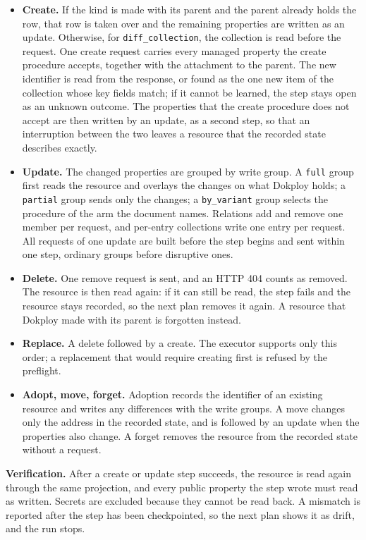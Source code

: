 \begin{itemize}
\item
  \textbf{Create.} If the kind is made with its parent and the parent already holds the row, that row is
  taken over and the remaining properties are written as an update. Otherwise, for \texttt{diff\_collection},
  the collection is read before the request. One create request carries every managed property the
  create procedure accepts, together with the attachment to the parent. The new identifier is read from
  the response, or found as the one new item of the collection whose key fields match; if it cannot
  be learned, the step stays open as an unknown outcome. The properties that the create procedure
  does not accept are then written by an update, as a second step, so that an interruption between
  the two leaves a resource that the recorded state describes exactly.
\item
  \textbf{Update.} The changed properties are grouped by write group. A \texttt{full} group first reads the
  resource and overlays the changes on what Dokploy holds; a \texttt{partial} group sends only the changes;
  a \texttt{by\_variant} group selects the procedure of the arm the document names. Relations add and remove
  one member per request, and per-entry collections write one entry per request. All requests of one
  update are built before the step begins and sent within one step, ordinary groups before disruptive
  ones.
\item
  \textbf{Delete.} One remove request is sent, and an HTTP 404 counts as removed. The resource is then read
  again: if it can still be read, the step fails and the resource stays recorded, so the next plan
  removes it again. A resource that Dokploy made with its parent is forgotten instead.
\item
  \textbf{Replace.} A delete followed by a create. The executor supports only this order; a replacement
  that would require creating first is refused by the preflight.
\item
  \textbf{Adopt, move, forget.} Adoption records the identifier of an existing resource and writes any
  differences with the write groups. A move changes only the address in the recorded state, and is
  followed by an update when the properties also change. A forget removes the resource from the
  recorded state without a request.
\end{itemize}

\textbf{Verification.} After a create or update step succeeds, the resource is read again through the same
projection, and every public property the step wrote must read as written. Secrets are excluded
because they cannot be read back. A mismatch is reported after the step has been checkpointed, so the
next plan shows it as drift, and the run stops.

